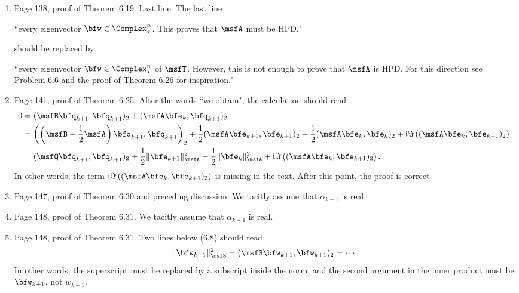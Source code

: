 \documentclass{book}
\begin{document}
\begin{enumerate}
	\item
Page 138, proof of Theorem 6.19. Last line. The last line

\hspace{0.25in}``every eigenvector $\bfw\in\Complex^n_\star$. This proves that $\msfA$ must be HPD."

\noindent should be replaced by

\hspace{0.25in}``every eigenvector $\bfw\in\Complex^n_\star$ of $\msfT$. However, this is not enough to prove that $\msfA$ is HPD. For this direction see Problem 6.6 and the proof of Theorem 6.26 for inspiration."

	\item
Page 141, proof of Theorem 6.25. After the words ``we obtain", the calculation should read
	\begin{align*}
0 &=  (\msfB\bfq_{k+1},\bfq_{k+1})_2 + (\msfA\bfe_k,\bfq_{k+1})_2 
	\\
&=  \left( \left(\msfB-\frac12\msfA \right)\bfq_{k+1},\bfq_{k+1} \right)_2 + \frac12(\msfA\bfe_{k+1},\bfe_{k+1})_2 - \frac12(\msfA\bfe_k,\bfe_k)_2 + \mathfrak{i}\Im\left((\msfA\bfe_k,\bfe_{k+1})_2 \right)
	\\
& =  (\msfQ\bfq_{k+1},\bfq_{k+1})_2 + \frac12 \| \bfe_{k+1} \|_{\msfA}^2 - \frac12 \| \bfe_k \|_{\msfA}^2 + \mathfrak{i}\Im\left((\msfA\bfe_k,\bfe_{k+1})_2 \right).
	\end{align*}
In other words, the term $\mathfrak{i}\Im\left((\msfA\bfe_k,\bfe_{k+1})_2 \right)$ is missing in the text. After this point, the proof is correct.

	\item
Page 147, proof of Theorem 6.30 and preceding discussion. We tacitly assume that $\alpha_{k+1}$ is real.

	\item
Page 148, proof of Theorem 6.31. We tacitly assume that $\alpha_{k+1}$ is real.

	\item
Page 148, proof of Theorem 6.31. Two lines below (6.8) should read
\[
	\| \bfw_{k+1} \|_{\msfS}^{2} = (\msfS \bfw_{k+1}, \bfw_{k+1} )_2 = \cdots
\]
In other words, the superscript must be replaced by a subscript inside the norm, and the second argument in the inner product must be $\bfw_{k+1}$, not $w_{k+1}$.


\end{enumerate}
\end{document}
